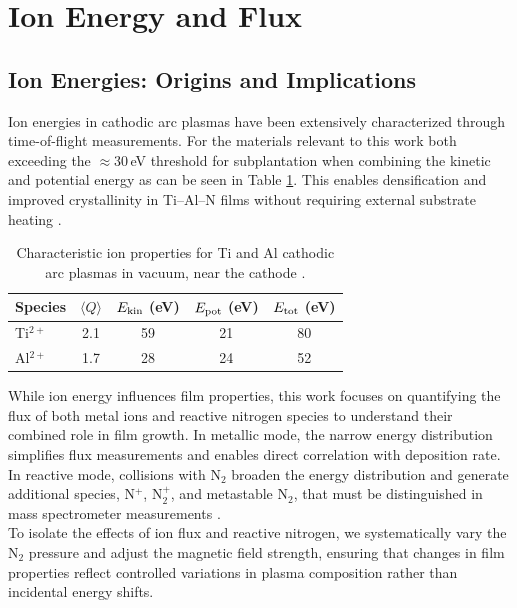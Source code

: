 \section{Ion Energy and Flux}

\subsection{Ion Energies: Origins and Implications}
\label{section:ion_energies}
Ion energies in cathodic arc plasmas have been extensively characterized through time-of-flight measurements. For the materials relevant to this work both exceeding the $\approx 30$\,eV threshold for subplantation when combining the kinetic and potential energy as can be seen in Table \ref{tab:ion_properties}. This enables densification and improved crystallinity in Ti–Al–N films without requiring external substrate heating \cite[Chap.~8.1--8.2]{cathodic_arcs}.\\

\begin{table}[htbp]
	\centering
	\caption{Characteristic ion properties for Ti and Al cathodic arc plasmas in vacuum, near the cathode \cite[App.~B; Table~B.8]{cathodic_arcs}.}
	\label{tab:ion_properties}
	\begin{tabular}{lcccc}
		\hline
		Species & $\langle Q \rangle$ & $E_{\rm kin}$ (eV) & $E_{\rm pot}$ (eV) & $E_{\rm tot}$ (eV) \\
		\hline
		Ti$^{2+}$ & 2.1 & 59 & 21 & 80 \\
		Al$^{2+}$ & 1.7 & 28 & 24 & 52 \\
		\hline
	\end{tabular}
\end{table}


While ion energy influences film properties, this work focuses on quantifying the flux of both metal ions and reactive nitrogen species to understand their combined role in film growth. In metallic mode, the narrow energy distribution simplifies flux measurements and enables direct correlation with deposition rate. In reactive mode, collisions with N$_2$ broaden the energy distribution and generate additional species, N$^+$, N$_2^+$, and metastable N$_2$, that must be distinguished in mass spectrometer measurements \cite{bendikt2012}.\\

To isolate the effects of ion flux and reactive nitrogen, we systematically vary the N$_2$ pressure and adjust the magnetic field strength, ensuring that changes in film properties reflect controlled variations in plasma composition rather than incidental energy shifts.




